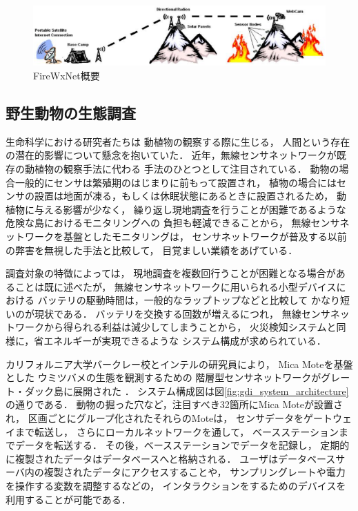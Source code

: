 \begin{figure}[htbp]
 \begin{center}
  \includegraphics[width=140mm]{./images/firewxnet_overview.eps}
 \end{center}
 \caption{FireWxNet概要}
 \label{fig:firewxnet_overview}
\end{figure}




\subsection{野生動物の生態調査}
生命科学における研究者たちは
動植物の観察する際に生じる，
人間という存在の潜在的影響について懸念を抱いていた．
近年，無線センサネットワークが既存の動植物の観察手法に代わる
手法のひとつとして注目されている．
動物の場合一般的にセンサは繁殖期のはじまりに前もって設置され，
植物の場合にはセンサの設置は地面が凍る，もしくは休眠状態にあるときに設置されるため，
動植物に与える影響が少なく，
繰り返し現地調査を行うことが困難であるような危険な島におけるモニタリングへの
負担も軽減できることから，
無線センサネットワークを基盤としたモニタリングは，
センサネットワークが普及する以前の弊害を無視した手法と比較して，
目覚ましい業績をあげている．

調査対象の特徴によっては，
現地調査を複数回行うことが困難となる場合があることは既に述べたが，
無線センサネットワークに用いられる小型デバイスにおける
バッテリの駆動時間は，一般的なラップトップなどと比較して
かなり短いのが現状である．
バッテリを交換する回数が増えるにつれ，
無線センサネットワークから得られる利益は減少してしまうことから，
火災検知システムと同様に，省エネルギーが実現できるような
システム構成が求められている．


カリフォルニア大学バークレー校とインテルの研究員により，
Mica Moteを基盤とした
ウミツバメの生態を観測するための
階層型センサネットワークがグレート・ダック島に展開された
\cite{Mainwaring:2002:WSN:570738.570751}．
システム構成図は図\ref{fig:gdi_system_architecture}の通りである．
動物の掘った穴など，注目すべき32箇所にMica Moteが設置され，
区画ごとにグループ化されたそれらのMoteは，
センサデータをゲートウェイまで転送し，
さらにローカルネットワークを通して，
ベースステーションまでデータを転送する．
その後，ベースステーションでデータを記録し，
定期的に複製されたデータはデータベースへと格納される．
ユーザはデータベースサーバ内の複製されたデータにアクセスすることや，
サンプリングレートや電力を操作する変数を調整するなどの，
インタラクションをするためのデバイスを利用することが可能である．

